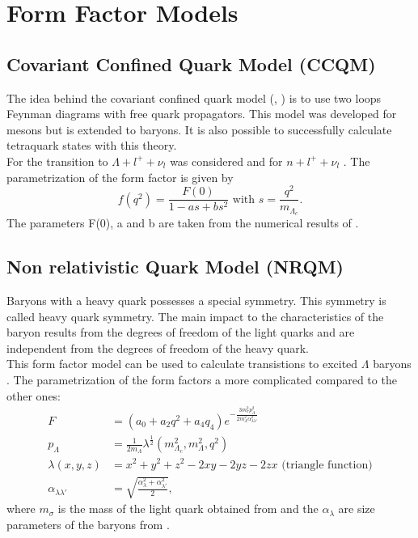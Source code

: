 \section{Form Factor Models}
\subsection{Covariant Confined Quark Model (CCQM)}
The idea behind the covariant confined quark model 
({\cite{CCQM_N}}, {\cite{CCQM_L}}) is to use two loops 
Feynman diagrams with free quark propagators. This model was developed for mesons but 
is extended to baryons. It is also possible to successfully calculate tetraquark 
states with this theory.\\
For the transition to \(\Lambda + l^+ + \nu_l\) {\cite{CCQM_L}} was 
considered and for \(n + l^+ + \nu_l\) {\cite{CCQM_N}}.
The parametrization of the form factor is given by
\begin{equation}
  f(q^2) = \frac{F(0)}{1 - a s + b s^2} \text{ with } s = \frac{q^2}{m_{\Lambda_c}} \label{eq:ccqmff}.
\end{equation}
The parameters F(0), a and b are taken from the numerical results of {\cite{CCQM_L}}.

\subsection{Non relativistic Quark Model (NRQM)}
Baryons with a heavy quark possesses a special symmetry. This symmetry is 
called heavy quark symmetry. The main impact to the characteristics of the baryon results from the degrees of freedom of the 
light quarks and are independent from the degrees of freedom of the heavy quark. {\cite{NRQM}}\\
This form factor model can be used to calculate transistions to excited \(\Lambda\)
baryons {\cite{NRQM}}. The parametrization of the form factors a more complicated compared 
to the other ones:
\begin{align}
  F &= \left(a_0 + a_2 q^2 + a_4 q_4\right) e^{- \frac{3 m_\sigma^2 p_\Lambda^2}
  {2 m_\Lambda^2 \alpha_{\lambda \lambda'}^2} } \nonumber\\
  p_\Lambda & = \frac{1}{2 m_\Lambda}  \lambda^\frac{1}{2}(m_{\Lambda_c}^2, m_\Lambda^2, q^2) \nonumber \\
  \lambda(x, y, z) & = x^2 + y^2 + z^2 - 2xy - 2yz - 2zx \text{ (triangle function)} \nonumber \\
  \alpha_{\lambda \lambda'} & = \sqrt{\frac{\alpha_\lambda^2 + \alpha_{\lambda'}^2 }{2}}, \label{eq:nrqmff}
\end{align}
where \(m_\sigma\) is the mass of the light quark obtained from 
{\cite[p. 13/I]{NRQM}} and the \(\alpha_\lambda\) are size parameters of 
the baryons from {\cite[p. 13/II]{NRQM}}.

